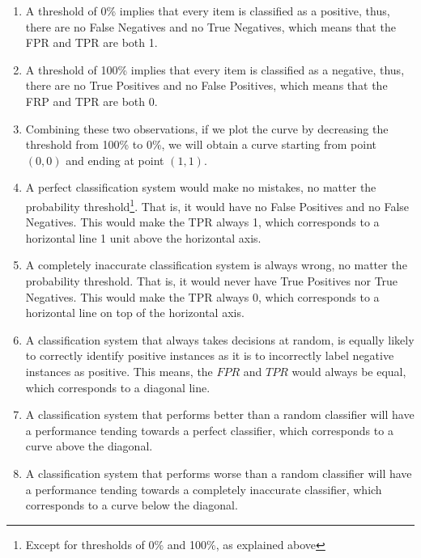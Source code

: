 \begin{enumerate}
    \item A threshold of 0\% implies that every item is classified as a positive, thus, there are no False Negatives and no True Negatives, which means that the FPR and TPR are both 1.

    \item A threshold of 100\% implies that every item is classified as a negative, thus, there are no True Positives and no False Positives, which means that the FRP and TPR are both 0.

    \item Combining these two observations, if we plot the curve by decreasing the threshold from 100\% to 0\%, we will obtain a curve starting from point $(0,0)$ and ending at point $(1,1)$.

    \item A perfect classification system would make no mistakes, no matter the probability threshold\footnote{Except for thresholds of 0\% and 100\%, as explained above}. That is, it would have no False Positives and no False Negatives. This would make the TPR always 1, which corresponds to a horizontal line 1 unit above the horizontal axis. 

    \item A completely inaccurate classification system is always wrong, no matter the probability threshold. That is, it would never have True Positives nor True Negatives. This would make the TPR always 0, which corresponds to a horizontal line on top of the horizontal axis.

    \item A classification system that always takes decisions at random, is equally likely to correctly identify positive instances as it is to incorrectly label negative instances as positive. This means, the $FPR$ and $TPR$ would always be equal, which corresponds to a diagonal line.

    \item A classification system that performs better than a random classifier will have a performance tending towards a perfect classifier, which corresponds to a curve above the diagonal.

    \item A classification system that performs worse than a random classifier will have a performance tending towards a completely inaccurate classifier, which corresponds to a curve below the diagonal.

\end{enumerate}

